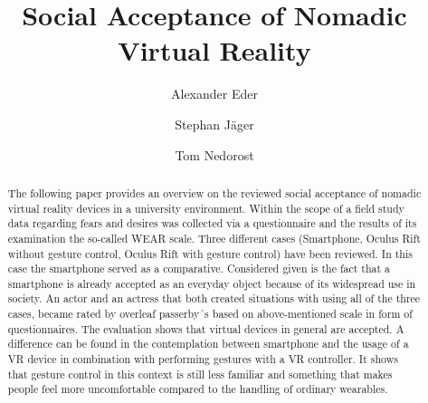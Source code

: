 \documentclass[sigchi]{acmart}
\begin{document}
\title{Social Acceptance of Nomadic Virtual Reality}

\author{Alexander Eder}

\author{Stephan Jäger}

\author{Tom Nedorost}

\renewcommand{\shortauthors}{Eder and Jäger and Nedorost}
\linenumbers

\begin{abstract}
The following paper provides an overview on the reviewed social acceptance of nomadic virtual reality devices in a university environment. Within the scope of a field study data regarding fears and desires was collected via a questionnaire and the results of its examination the so-called WEAR scale. Three different cases (Smartphone, Oculus Rift without gesture control, Oculus Rift with gesture control) have been reviewed. In this case the smartphone served as a comparative. Considered given is the fact that a smartphone is already accepted as an everyday object because of its widespread use in society.
An actor and an actress that both created situations with using all of the three cases, became rated by overleaf passerby´s based on above-mentioned scale in form of questionnaires. The evaluation shows that virtual devices in general are accepted. A difference can be found in the contemplation between smartphone and the usage of a VR device in combination with performing gestures with a VR controller. It shows that gesture control in this context is still less familiar and something that makes people feel more uncomfortable compared to the handling of ordinary wearables.
\end{abstract}
\end{document}
